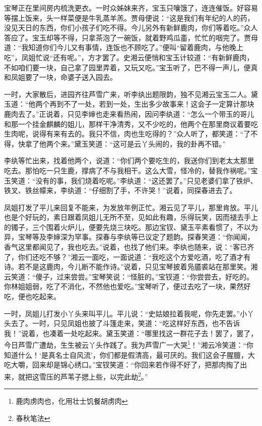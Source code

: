 \documentclass[12pt,oneside]{book}
\begin{document}
宝琴正在里间房内梳洗更衣。一时众姊妹来齐，宝玉只嚷饿了，连连催饭。好容易等摆上饭来，头一样菜便是牛乳蒸羊羔。贾母便说：“这是我们有年纪的人的药，没见天日的东西，你们小孩子们吃不得。今儿另外有新鲜鹿肉，你们等着吃。”众人答应了。宝玉却等不得，只拿茶泡了一碗饭，就着野鸡瓜齑，忙忙的咽完了。贾母道：“我知道你们今儿又有事情，连饭也不顾吃了。”便叫“留着鹿肉，与他晚上吃”，凤姐忙说“还有呢。”，方才罢了。史湘云便悄和宝玉计较道：“有新鲜鹿肉，不如咱们要一块，自己拿了园里弄着，又玩又吃。”宝玉听了，巴不得一声儿，便真和凤姐要了一块，命婆子送入园去。

一时，大家散后，进园齐往芦雪广来，听李纨出题限韵，独不见湘云宝玉二人。黛玉道：“他两个再到不了一处，若到一处，生出多少故事来！这会子一定算计那块鹿肉去了。”正说着，只见李婶也走来看热闹，因问李纨道：“怎么一个带玉的哥儿和那一个挂金麒麟的姐儿，那样干净清秀，又不少吃的，他两个在那里商议着要吃生肉呢，说得有来有去的。我只不信，肉也生吃得的？”众人听了，都笑道：“了不得，快拿了他两个来。”黛玉笑道：“这可是云丫头闹的，我的卦再不错。”

李纨等忙出来，找着他两个，说道：“你们两个要吃生的，我送你们到老太太那里吃去。那怕吃一只生鹿，撑病了不与我相干。这么大雪，怪冷的，替我作祸呢。”宝玉笑道：“没有的事，我们烧着吃呢。”李纨道：“这还罢了。”只见老婆们拿了铁炉、铁叉、铁丝幪来，李纨道：“仔细割了手，不许哭！”说着，同探春进去了。

凤姐打发了平儿来回复不能来，为发放年例正忙。湘云见了平儿，那里肯放。平儿也是个好玩的，素日跟着凤姐儿无所不至，见如此有趣，乐得玩笑，因而褪去手上的镯子，三个围着火炉儿，便要先烧三块吃。那边宝钗、黛玉平素看惯了，不以为异，宝琴等及李婶深为罕事。探春与李纨等已议定了题韵。探春笑道：“你闻闻，香气这里都闻见了，我也吃去。”说着，也找了他们来。李纨也随来，说：“客已齐了，你们还吃不够？”湘云一面吃，一面说道：“我吃这个方爱吃酒，吃了酒才有诗。若不是这鹿肉，今儿断不能作诗。”说着，只见宝琴披着凫靥裘站在那里笑。湘云笑道：“傻子，过来尝尝。”宝琴笑说：“怪脏的。”宝钗道：“你尝尝去，好吃的。你林姐姐弱，吃了不消化，不然他也爱吃。”宝琴听了，便过去吃了一块，果然好吃，便也吃起来。

一时，凤姐儿打发小丫头来叫平儿。平儿说：“史姑娘拉着我呢，你先走罢。”小丫头去了。一时，只见凤姐也披了斗篷走来，笑道：“吃这样好东西，也不告诉我！”说着，也凑着一处吃起来。黛玉笑道：“哪里找这一群花子去！罢了，罢了，今日芦雪广遭劫，生生被云丫头作践了。我为芦雪广一大哭\footnote{鹿肉虏肉也，化用壮士饥餐胡虏肉}！”湘云冷笑道：“你知道什么！‘是真名士自风流’，你们都是假清高，最可厌的。我们这会子腥膻，大吃大嚼，回来却是锦心绣口。”宝钗笑道：“你回来若作得不好了，把那肉掏了出来，就把这雪压的芦苇子揌上些，以完此劫\footnote{春秋笔法}。”
\end{document}
